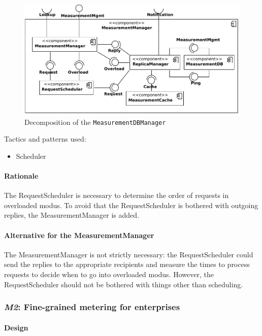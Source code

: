 \documentclass[a4paper,10pt]{article}
\begin{document}
\begin{figure}[!htp]
    \centering
    \includegraphics[width=\textwidth]{Decomposition_ MeasurementDBManager}
    \caption{Decomposition of the \texttt{MeasurementDBManager}}\label{fig:dec_measurement}
\end{figure}

\noindent Tactics and patterns used:
\begin{itemize}
	\item Scheduler
\end{itemize}

\paragraph{Rationale} The RequestScheduler is necessary to determine the order of requests in overloaded modus. To avoid that the RequestScheduler is bothered with outgoing replies, the MeasurementManager is added.

\paragraph{Alternative for the MeasurementManager} The MeasurementManager is not strictly necessary: the RequestScheduler could send the replies to the appropriate recipients and measure the times to process requests to decide when to go into overloaded modus. However, the RequestScheduler should not be bothered with things other than scheduling.


\subsubsection{\emph{M2}: Fine-grained metering for enterprises}

\paragraph{Design}
\end{document}
